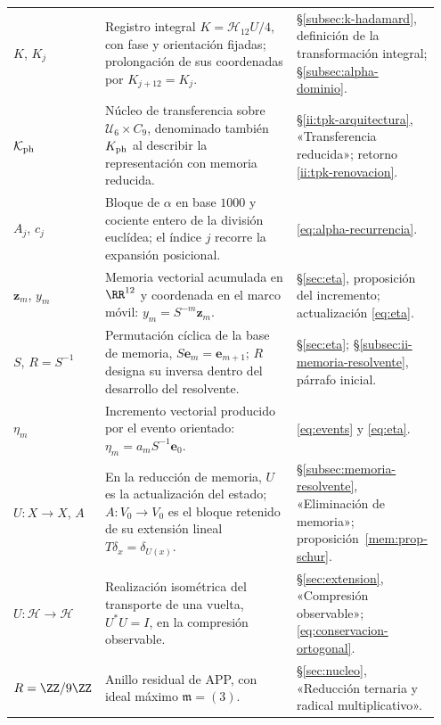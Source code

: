 \begin{longtable}{@{}>{\raggedright\arraybackslash}p{0.19\linewidth}
                    >{\raggedright\arraybackslash}p{0.49\linewidth}
                    >{\raggedright\arraybackslash}p{0.27\linewidth}@{}}
\(K\), \(K_j\)
& Registro integral \(K=\mathcal H_{12}U/4\), con fase y orientación
  fijadas; prolongación de sus coordenadas por \(K_{j+12}=K_j\).
& \S\ref{subsec:k-hadamard}, definición de la transformación integral;
  \S\ref{subsec:alpha-dominio}.\\[3pt]

\(\mathcal K_{\rm ph}\)
& Núcleo de transferencia sobre \(\mathcal U_6\times C_9\),
  denominado también \(K_{\rm ph}\) al describir la representación con
  memoria reducida.
& \S\ref{ii:tpk-arquitectura}, «Transferencia reducida»;
  retorno \eqref{ii:tpk-renovacion}.\\[3pt]

\(A_j\), \(c_j\)
& Bloque de \(\alpha\) en base \(1000\) y cociente entero de la
  división euclídea; el índice \(j\) recorre la expansión posicional.
& \eqref{eq:alpha-recurrencia}.\\[3pt]

\(\mathbf z_m\), \(y_m\)
& Memoria vectorial acumulada en \(\RR^{12}\) y coordenada en el
  marco móvil: \(y_m=S^{-m}\mathbf z_m\).
& \S\ref{sec:eta}, proposición del incremento;
  actualización \eqref{eq:eta}.\\[3pt]

\(S\), \(R=S^{-1}\)
& Permutación cíclica de la base de memoria,
  \(S\mathbf e_m=\mathbf e_{m+1}\); \(R\) designa su inversa
  dentro del desarrollo del resolvente.
& \S\ref{sec:eta};
  \S\ref{subsec:ii-memoria-resolvente}, párrafo inicial.\\[3pt]

\(\eta_m\)
& Incremento vectorial producido por el evento orientado:
  \(\eta_m=a_mS^{-1}\mathbf e_0\).
& \eqref{eq:events} y \eqref{eq:eta}.\\[3pt]

\(U:X\to X\), \(A\)
& En la reducción de memoria, \(U\) es la actualización del estado;
  \(A:V_0\to V_0\) es el bloque retenido de su extensión lineal
  \(T\delta_x=\delta_{U(x)}\).
& \S\ref{subsec:memoria-resolvente}, «Eliminación de memoria»;
  proposición~\ref{mem:prop-schur}.\\[3pt]

\(U:\mathcal H\to\mathcal H\)
& Realización isométrica del transporte de una vuelta,
  \(U^*U=I\), en la compresión observable.
& \S\ref{sec:extension}, «Compresión observable»;
  \eqref{eq:conservacion-ortogonal}.\\[3pt]

\(R=\ZZ/9\ZZ\)
& Anillo residual de APP, con ideal máximo
  \(\mathfrak m=(3)\).
& \S\ref{sec:nucleo}, «Reducción ternaria y radical multiplicativo».\\[3pt]


\end{longtable}
